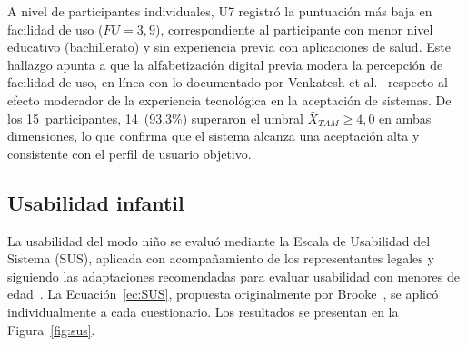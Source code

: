 				A nivel de participantes individuales, U7 registró la puntuación más baja en facilidad de uso ($FU = 3{,}9$), correspondiente al participante con menor nivel educativo (bachillerato) y sin experiencia previa con aplicaciones de salud. Este hallazgo apunta a que la alfabetización digital previa modera la percepción de facilidad de uso, en línea con lo documentado por Venkatesh et al.~\cite{Venkatesh2003} respecto al efecto moderador de la experiencia tecnológica en la aceptación de sistemas. De los 15~participantes, 14~(93,3\%) superaron el umbral $\bar{X}_{TAM} \geq 4{,}0$ en ambas dimensiones, lo que confirma que el sistema alcanza una aceptación alta y consistente con el perfil de usuario objetivo.
				
			\subsection{Usabilidad infantil}
				La usabilidad del modo niño se evaluó mediante la Escala de Usabilidad del Sistema (SUS), aplicada con acompañamiento de los representantes legales y siguiendo las adaptaciones recomendadas para evaluar usabilidad con menores de edad~\cite{Putnam2020}. La Ecuación~\eqref{ec:SUS}, propuesta originalmente por Brooke~\cite{Brooke1996}, se aplicó individualmente a cada cuestionario. Los resultados se presentan en la Figura~\ref{fig:sus}.
				
